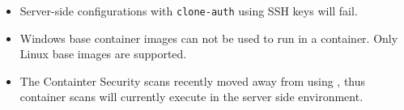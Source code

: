 \begin{itemize}
  \item Server-side configurations with \texttt{clone-auth} using SSH keys will fail.
  \item Windows base container images can not be used to run \scaresolver in a container.  Only Linux base images are supported.
  \item The Containter Security scans recently moved away from using \scaresolverns, thus container scans will currently
    execute in the \cxoneflow server side environment.
\end{itemize}

